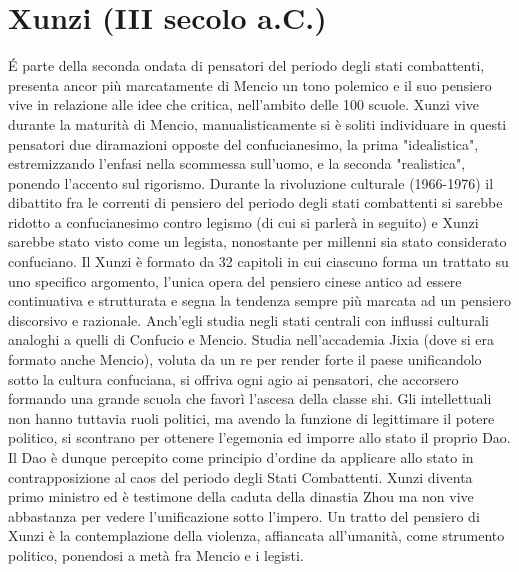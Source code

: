 \documentclass[10pt,a4paper]{report}
\begin{document}
\section{Xunzi (III secolo a.C.)}
\'E parte della seconda ondata di pensatori del periodo degli stati combattenti, presenta ancor più marcatamente di Mencio un tono polemico e il suo pensiero vive in relazione alle idee che critica, nell'ambito delle 100 scuole. Xunzi vive durante la maturità di Mencio, manualisticamente si è soliti individuare in questi pensatori due diramazioni opposte del confucianesimo, la prima "idealistica", estremizzando l'enfasi nella scommessa sull'uomo, e la seconda "realistica", ponendo l'accento sul rigorismo. Durante la rivoluzione culturale (1966-1976) il dibattito fra le correnti di pensiero del periodo degli stati combattenti si sarebbe ridotto a confucianesimo contro legismo (di cui si parlerà in seguito) e Xunzi sarebbe stato visto come un legista, nonostante per millenni sia stato considerato confuciano. Il Xunzi è formato da 32 capitoli in cui ciascuno forma un trattato su uno specifico argomento, l'unica opera del pensiero cinese antico ad essere continuativa e strutturata e segna la tendenza sempre più marcata ad un pensiero discorsivo e razionale. Anch'egli studia negli stati centrali con influssi culturali analoghi a quelli di Confucio e Mencio. Studia nell'accademia Jixia (dove si era formato anche Mencio), voluta da un re per render forte il paese unificandolo sotto la cultura confuciana, si offriva ogni agio ai pensatori, che accorsero formando una grande scuola che favorì l'ascesa della classe shi. Gli intellettuali non hanno tuttavia ruoli politici, ma avendo la funzione di legittimare il potere politico, si scontrano per ottenere l'egemonia ed imporre allo stato il proprio Dao. Il Dao è dunque percepito come principio d'ordine da applicare allo stato in contrapposizione al caos del periodo degli Stati Combattenti. Xunzi diventa primo ministro ed è testimone della caduta della dinastia Zhou ma non vive abbastanza per vedere l'unificazione sotto l'impero. Un tratto del pensiero di Xunzi è la contemplazione della violenza, affiancata all'umanità, come strumento politico, ponendosi a metà fra Mencio e i legisti.
\end{document}
